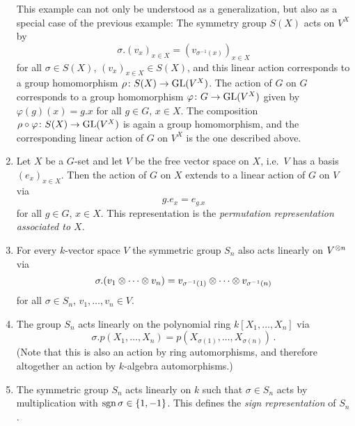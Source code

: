 \begin{example}
\begin{enumerate}
      This example can not only be understood as a generalization, but also as a special case of the previous example:
      The symmetry group $S(X)$ acts on $V^X$ by
      \[
          \sigma . (v_x)_{x \in X}
        = (v_{\sigma^{-1}(x)})_{x \in X}
      \]
      for all $\sigma \in S(X)$, $(v_x)_{x \in X} \in S(X)$, and this linear action corresponds to a group homomorphism $\rho \colon S(X) \to \operatorname{GL}(V^X)$.
      The action of $G$ on $G$ corresponds to a group homomorphism $\varphi \colon G \to \operatorname{GL}(V^X)$ given by $\varphi(g)(x) = g.x$ for all $g \in G$, $x \in X$.
      The composition $\rho \circ \varphi \colon S(X) \to \operatorname{GL}(V^X)$ is again a group homomorphism, and the corresponding linear action of $G$ on $V^X$ is the one described above.
    \item
      Let $X$ be a $G$-set and let $V$ be the free vector space on $X$, i.e.\ $V$ has a basis $(e_x)_{x \in X}$.
      Then the action of $G$ on $X$ extends to a linear action of $G$ on $V$ via
      \[
          g.e_x
        = e_{g.x}
      \]
      for all $g \in G$, $x \in X$.
      This representation is the \emph{permutation representation associated to $X$}.
    \item
      For every $k$-vector space $V$ the symmetric group $S_n$ also acts linearly on $V^{\mathbin{\otimes} n}$ via
      \[
          \sigma.(v_1 \mathbin{\otimes} \dotsb \mathbin{\otimes} v_n)
        = v_{\sigma^{-1}(1)} \mathbin{\otimes} \dotsb \mathbin{\otimes} v_{\sigma^{-1}(n)}
      \]
      for all $\sigma \in S_n$, $v_1, \dotsc, v_n \in V$.
    \item
      The group $S_n$ acts linearly on the polynomial ring $k[X_1, \dotsc, X_n]$ via
      \[
          \sigma.p(X_1, \dotsc, X_n)
        = p(X_{\sigma(1)}, \dotsc, X_{\sigma(n)}) \,.
      \]
      (Note that this is also an action by ring automorphisms, and therefore altogether an action by $k$-algebra automorphisms.)
    \item
      The symmetric group $S_n$ acts linearly on $k$ such that $\sigma \in S_n$ acts by multiplication with $\operatorname{sgn} \sigma \in \{1, -1\}$.
      This defines the \emph{sign representation} of $S_n$.
      

\end{enumerate}
\end{example}
